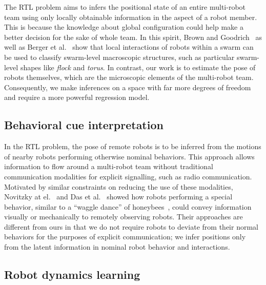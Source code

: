 \documentclass[letterpaper, 10 pt, conference]{ieeeconf}  %
\begin{document}
    The RTL problem aims to infers the positional state of an entire
    multi-robot team using only locally obtainable information in the
    aspect of a robot member. This is because the knowledge about global
    configuration could help make a better decision for the sake of
    whole team. In this spirit, Brown and Goodrich~\cite{BG14} as well
    as Berger et al.~\cite{BSB16} show that local interactions of robots
    within a swarm can be used to classify swarm-level macroscopic
    structures, such as particular swarm-level shapes like \emph{flock}
    and \emph{torus}. In contrast, our work is to estimate the pose of
    robots themselves, which are the microscopic elements of the
    multi-robot team. Consequently, we make inferences on a space with
    far more degrees of freedom and require a more powerful regression
    model.

	\subsection{Behavioral cue interpretation}
	\label{sec:behavioral_cue_interpretation}

    In the RTL problem, the pose of remote robots is to be inferred from
    the motions of nearby robots performing otherwise nominal behaviors.
    This approach allows information to flow around a multi-robot team
    without traditional communication modalities for explicit
    signalling, such as radio communication. Motivated by similar
    constraints on reducing the use of these modalities, Novitzky at
    el.~\cite{NPCBW12} and Das et al.~\cite{DCV16} showed how robots
    performing a special behavior, similar to a ``waggle dance'' of
    honeybees~\cite{VonFrisch67}, could convey information visually or
    mechanically to remotely observing robots. Their approaches are
    different from ours in that we do not require robots to deviate from
    their normal behaviors for the purposes of explicit communication;
    we infer positions only from the latent information in nominal robot
    behavior and interactions.

	\subsection{Robot dynamics learning}
	\label{sec:robot_dynamics_learning}
\end{document}
